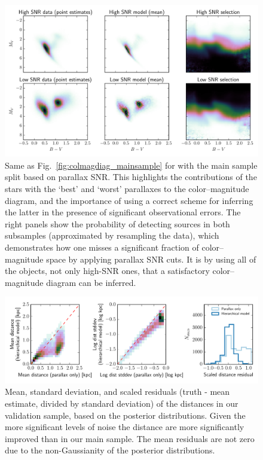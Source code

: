 \documentclass[manuscript, letterpaper]{aastex6}
\newcommand{\figref}[1]{{\xspace}Fig.~\ref{#1}}
\begin{document}
\begin{figure}
\hspace*{-4mm}\includegraphics[width=15.9cm]{colmagdiag_othersamples.pdf}
\caption{Same as \figref{fig:colmagdiag_mainsample} for with the main sample split based on parallax SNR. This highlights the contributions of the stars with the `best' and `worst' parallaxes to the color--magnitude diagram, and the importance of using a correct scheme for inferring the latter in the presence of significant observational errors. The right panels show the probability of detecting sources in both subsamples (approximated by resampling the data), which demonstrates how one misses a significant fraction of color--magnitude space by applying parallax SNR cuts. It is by using all of the objects, not only high-SNR ones, that a satisfactory color--magnitude diagram can be inferred.}
\label{fig:colmagdiag_othersamples}
\end{figure}

\begin{figure}
\hspace*{-3mm}\includegraphics[width=15.8cm]{cv_metrics.pdf}
\caption{Mean, standard deviation, and scaled residuals (truth - mean estimate, divided by standard deviation) of the distances in our validation sample, based on the posterior distributions.
Given the more significant levels of noise the distance are more significantly improved than in our main sample. 
The mean residuals are not zero due to the non-Gaussianity of the posterior distributions.}
\label{fig:cv_metrics}
\end{figure}
\end{document}
